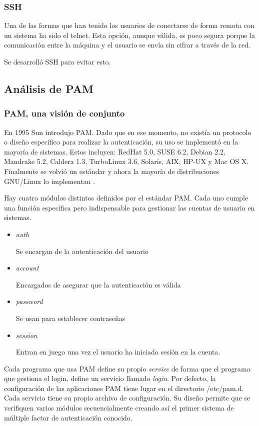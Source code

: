 \documentclass[titlepage, 12pt, a4paper]{article}
\begin{document}
\subsubsection{\Gls{SSH}}
Una de las formas que han tenido los usuarios de conectarse de forma remota con un sistema ha sido el \Gls{telnet}. Esta opción, aunque válida, es poco segura porque la comunicación entre la máquina y el usuario se envía sin cifrar a través de la red.\par Se desarrolló SSH para evitar esto.
\subsection{Análisis de \Gls{PAM}}
\subsubsection{PAM, una visión de conjunto}
En 1995 \Gls{Sun} introdujo \Gls{PAM}. Dado que en ese momento, no existía un protocolo o diseño específico para realizar la autenticación, su uso se implementó en la mayoría de sistemas. Estos incluyen:
RedHat 5.0,
SUSE 6.2,
Debian 2.2,
Mandrake 5.2,
Caldera 1.3,
TurboLinux 3.6,
Solaris,
AIX,
HP-UX y
Mac OS X.
Finalmente se volvió un estándar y ahora la mayoría de distribuciones \Gls{GNU/Linux} lo implementan \cite{IBMPAM}. \par
Hay cuatro módulos distintos definidos por el estándar PAM. Cada uno cumple una función específica pero indispensable para gestionar las cuentas de usuario en sistemas\cite{redPAM}.
\begin{itemize}
	\item \textit{auth} \par Se encargan de la autenticación del usuario
	\item \textit{account} \par Encargados de asegurar que la autenticación es válida
	\item \textit{password} \par Se usan para establecer contraseñas
	\item \textit{session} \par Entran en juego una vez el usuario ha iniciado sesión en la cuenta.
\end{itemize} \par
Cada programa que usa PAM define su propio \textit{service} de forma que el programa que gestiona el login, define un servicio llamado \textit{login}. 
Por defecto, la configuración de las aplicaciones PAM tiene lugar en el directorio /etc/pam.d. Cada servicio tiene su propio archivo de configuración. 
Su diseño permite que se verifiquen varios módulos secuencialmente creando así el primer sistema de múltiple factor de autenticación conocido. \par \noindent
\end{document}
